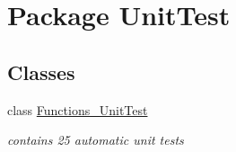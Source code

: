\hypertarget{namespace_unit_test}{\section{Package Unit\+Test}
\label{namespace_unit_test}
}
\subsection*{Classes}
\begin{DoxyCompactItemize}
\item 
class \hyperlink{class_unit_test_1_1_functions___unit_test}{Functions\+\_\+\+Unit\+Test}
\begin{DoxyCompactList}\small\item\em contains 25 automatic unit tests \end{DoxyCompactList}\end{DoxyCompactItemize}
